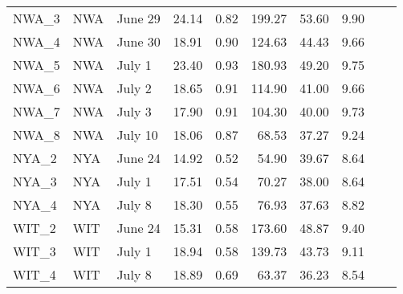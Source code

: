 \begin{longtable}{lllllrrrrr}
  NWA\_3 & NWA & June 29 & 24.14 & 0.82 & 199.27 & 53.60 & 9.90 \\ 
  NWA\_4 & NWA & June 30 & 18.91 & 0.90 & 124.63 & 44.43 & 9.66 \\ 
  NWA\_5 & NWA & July 1 & 23.40 & 0.93 & 180.93 & 49.20 & 9.75 \\ 
  NWA\_6 & NWA & July 2 & 18.65 & 0.91 & 114.90 & 41.00 & 9.66 \\ 
  NWA\_7 & NWA & July 3 & 17.90 & 0.91 & 104.30 & 40.00 & 9.73 \\ 
  NWA\_8 & NWA & July 10 & 18.06 & 0.87 & 68.53 & 37.27 & 9.24 \\ 
  NYA\_2 & NYA & June 24 & 14.92 & 0.52 & 54.90 & 39.67 & 8.64 \\ 
  NYA\_3 & NYA & July 1 & 17.51 & 0.54 & 70.27 & 38.00 & 8.64 \\ 
  NYA\_4 & NYA & July 8 & 18.30 & 0.55 & 76.93 & 37.63 & 8.82 \\ 
  WIT\_2 & WIT & June 24 & 15.31 & 0.58 & 173.60 & 48.87 & 9.40 \\ 
  WIT\_3 & WIT & July 1 & 18.94 & 0.58 & 139.73 & 43.73 & 9.11 \\ 
  WIT\_4 & WIT & July 8 & 18.89 & 0.69 & 63.37 & 36.23 & 8.54 \\ 
   \hline
\end{longtable}

%